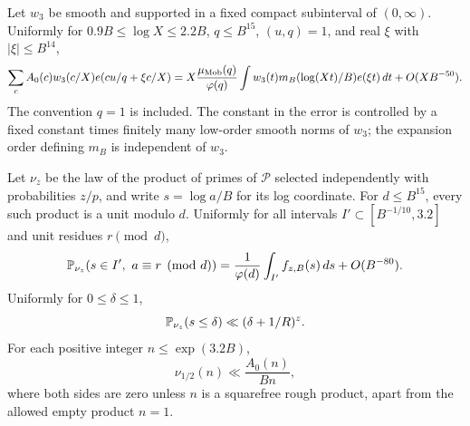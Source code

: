 \begin{proposition}
\label{prop:arith-local-laws}
Let $w_3$ be smooth and supported in a fixed compact subinterval of
$(0,\infty)$.  Uniformly for
$0.9B\le\log X\le2.2B$, $q\le B^{15}$, $(u,q)=1$, and real $\xi$ with
$|\xi|\le B^{14}$,
\begin{equation}
 \sum_c A_0(c)w_3(c/X)e(cu/q+\xi c/X)
 =X\frac{\mu_{\rm Mob}(q)}{\varphi(q)}
       \int w_3(t)m_B(\log(Xt)/B)e(\xi t)\,dt
       +O(XB^{-50}).
 \label{eq:1}
\end{equation}
The convention $q=1$ is included.  The constant in the error is controlled
by a fixed constant times finitely many low-order smooth norms of $w_3$;
the expansion order defining $m_B$ is independent of $w_3$.

Let $\nu_z$ be the law of the product of primes of $\mathcal P$ selected
independently with probabilities $z/p$, and write $s=\log a/B$ for its log
coordinate.  For $d\le B^{15}$, every such product is a unit modulo $d$.
Uniformly for all intervals $I'\subset[B^{-1/10},3.2]$ and unit residues
$r\pmod d$,
\begin{equation}
 \mathbb P_{\nu_z}(s\in I',\ a\equiv r\pmod d)
 =\frac1{\varphi(d)}\int_{I'}f_{z,B}(s)\,ds+O(B^{-80}).
 \label{eq:2}
\end{equation}
Uniformly for $0\le\delta\le1$,
\begin{equation}
 \mathbb P_{\nu_z}(s\le\delta)\ll(\delta+1/R)^z.
 \label{eq:3}
\end{equation}
For each positive integer $n\le\exp(3.2B)$,
\begin{equation}
 \nu_{1/2}(n)\ll\frac{A_0(n)}{Bn},
 \label{eq:4}
\end{equation}
where both sides are zero unless $n$ is a squarefree rough product, apart
from the allowed empty product $n=1$.
\end{proposition}

